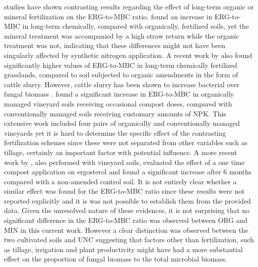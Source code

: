 	studies have shown contrasting results regarding the effect of long-term organic or mineral fertilization on the ERG-to-MBC ratio. \citet{heinze2010} found an increase in ERG-to-MBC in long-term chemically, compared with organically, fertilized soils, yet the mineral treatment was accompanied by a high straw return while the organic treatment was not, indicating that these differences might not have been  singularly affected by synthetic nitrogen application. A recent work by \citet{knoblauch2017} also found significantly higher values of ERG-to-MBC in long-term chemically fertilized grasslands, compared to soil subjected to organic amendments in the form of cattle slurry. However, cattle slurry has been shown to increase bacterial over fungal biomass \citet{knoblauch2017}.
	\citet{probst2008} found a significant increase in ERG-to-MBC in organically managed vineyard soils receiving occasional compost doses, compared with conventionally managed soils receiving customary amounts of NPK. This extensive work included four pairs of organically and conventionally managed vineyards yet it is hard to determine the specific effect of the contrasting fertilization schemes since these were not separated from other variables such as tillage, certainly an important factor with potential influence. A more recent work by \citet{mackie2015} , also performed with vineyard soils, evaluated the effect of a one time compost application on ergosterol and found a significant increase after 6 months compared with a non-amended control soil. It is not entirely clear whether a similar effect was found for the ERG-to-MBC ratio since these results were not reported explicitly and it is was not possible to establish them from the provided data.
	Given the unresolved nature of these evidences, it is not surprising that no significant difference in the ERG-to-MBC ratio was observed between ORG and MIN in this current work. However a clear distinction was observed between the two cultivated soils and UNC suggesting that factors other than fertilization, such as tillage, irrigation and plant productivity might have had a more substantial effect on the proportion of fungal biomass to the total microbial biomass.

